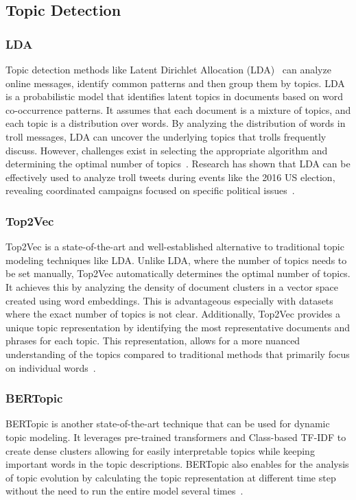 \documentclass[twoside]{ctuthesis}
\theoremstyle{plain}
\theoremstyle{definition}
\theoremstyle{note}
\begin{document}
\section{Topic Detection}

\subsection{LDA}
Topic detection methods like Latent Dirichlet Allocation (LDA)~\cite{Blei2001LDA} can analyze online messages, identify common patterns and then group them by topics. LDA is a probabilistic model that identifies latent topics in documents based on word co-occurrence patterns. It assumes that each document is a mixture of topics, and each topic is a distribution over words. By analyzing the distribution of words in troll messages, LDA can uncover the underlying topics that trolls frequently discuss. However, challenges exist in selecting the appropriate algorithm and determining the optimal number of topics~\cite{Ruediger2022TopicModellingRevisited}. Research has shown that LDA can be effectively used to analyze troll tweets during events like the 2016 US election, revealing coordinated campaigns focused on specific political issues~\cite{Golino2022Elections}.

\subsection{Top2Vec}
Top2Vec is a state-of-the-art and well-established alternative to traditional topic modeling techniques like LDA. Unlike LDA, where the number of topics needs to be set manually, Top2Vec automatically determines the optimal number of topics. It achieves this by analyzing the density of document clusters in a vector space created using word embeddings. This is advantageous especially with datasets where the exact number of topics is not clear. Additionally, Top2Vec provides a unique topic representation by identifying the most representative documents and phrases for each topic. This representation, allows for a more nuanced understanding of the topics compared to traditional methods that primarily focus on individual words~\cite{Angelov2024}.

\subsection{BERTopic}
BERTopic is another state-of-the-art technique that can be used for dynamic topic modeling. It leverages pre-trained transformers and Class-based TF-IDF to create dense clusters allowing for easily interpretable topics while keeping important words in the topic descriptions. BERTopic also enables for the analysis of topic evolution by calculating the topic representation at different time step without the need to run the entire model several times~\cite{Grootendorst2022BERTopic}.



\chapter{}



\appendix

\printindex

 

\end{document}
